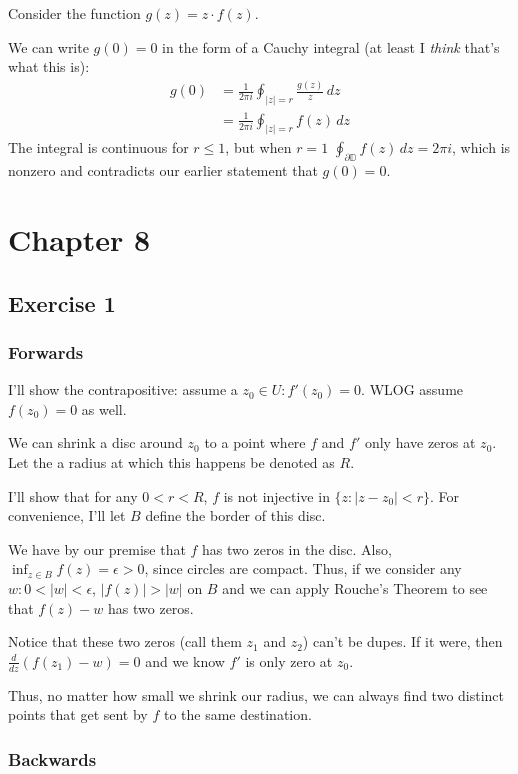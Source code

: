 \documentclass[12pt]{article}
\begin{document}
Consider the function $g(z)=z \cdot f(z)$.

We can write $g(0)=0$ in the form of a Cauchy integral
(at least I \textit{think} that's what this is):
\begin{align*}
  g(0)
  &=\frac{1}{2\pi i} \oint_{|z|=r} \frac{g(z)}{z}\,dz \\
  &= \frac{1}{2\pi i} \oint_{|z|=r} f(z)\,dz
\end{align*}
The integral is continuous for $r \le 1$, but when $r=1$ $\oint_{\partial \mathbb{D}} f(z)\,dz=2\pi i$,
which is nonzero and contradicts our earlier statement that $g(0)=0$.

\pagebreak

\section{Chapter 8}

\subsection{Exercise 1}

\subsubsection{Forwards}

I'll show the contrapositive: assume a $z_0 \in U: f'(z_0)=0$.
WLOG assume $f(z_0)=0$ as well.

We can shrink a disc around $z_0$ to a point where $f$ and $f'$ only have zeros at $z_0$.
Let the a radius at which this happens be denoted as $R$.

I'll show that for any $0 < r < R$, $f$ is not injective in $\{z: |z-z_0| < r\}$.
For convenience, I'll let $B$ define the border of this disc.

We have by our premise that $f$ has two zeros in the disc.
Also, $\inf_{z \in B} f(z)=\epsilon > 0$, since circles are compact.
Thus, if we consider any $w: 0 < |w| < \epsilon$, $|f(z)| > |w|$ on $B$
and we can apply Rouche's Theorem to see that $f(z)-w$ has two zeros.

Notice that these two zeros (call them $z_1$ and $z_2$) can't be dupes.
If it were, then $\frac{d}{dz} (f(z_1)-w)=0$ and we know $f'$ is only zero at $z_0$.

Thus, no matter how small we shrink our radius, we can always find two distinct
points that get sent by $f$ to the same destination.

\subsubsection{Backwards}
\end{document}
